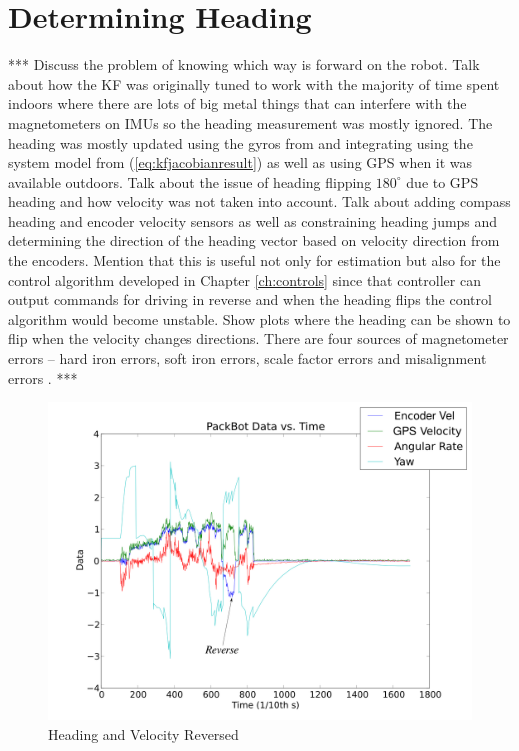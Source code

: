 \section{Determining Heading}
\label{sec:determineHeading}
*** Discuss the problem of knowing which way is forward on the robot. Talk about how the KF was originally tuned to work with the majority of time spent indoors where there are lots of big metal things that can interfere with the magnetometers on IMUs so the heading measurement was mostly ignored. The heading was mostly updated using the gyros from and integrating using the system model from (\ref{eq:kfjacobianresult}) as well as using GPS when it was available outdoors. Talk about the issue of heading flipping $180^\circ$ due to GPS heading and how velocity was not taken into account. Talk about adding compass heading and encoder velocity sensors as well as constraining heading jumps and determining the direction of the heading vector based on velocity direction from the encoders. Mention that this is useful not only for estimation but also for the control algorithm developed in Chapter \ref{ch:controls} since that controller can output commands for driving in reverse and when the heading flips the control algorithm would become unstable. Show plots where the heading can be shown to flip when the velocity changes directions. There are four sources of magnetometer errors -- hard iron errors, soft iron errors, scale factor errors and misalignment errors \cite{ParkinsonHeadingEstimation01}. ***

\begin{figure}[ht!]
	\centering
	\includegraphics[width=.8\textwidth]{images/pbDataReverseHeading}
	\caption{Heading and Velocity Reversed}
	\label{fig:pbDataReverseHeading}
\end{figure}

